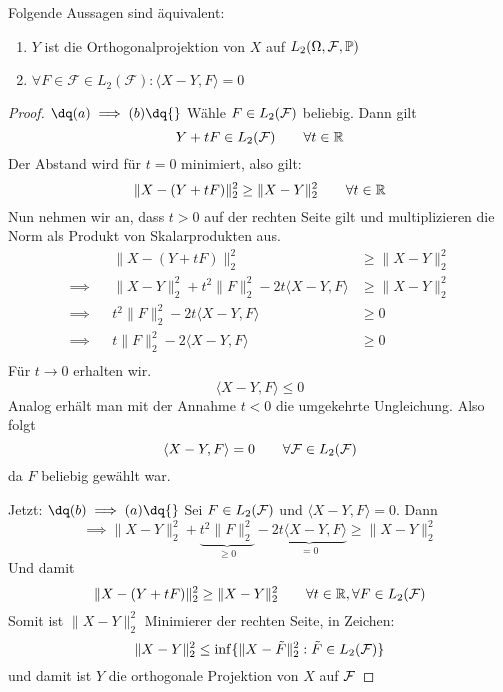 \begin{proposition}\label{Prop1.3}
	Folgende Aussagen sind äquivalent:
	\renewcommand{\labelenumi}{(\alph{enumi})}
	\begin{enumerate}
		\item $Y$ ist die Orthogonalprojektion von $X$ auf $L_2(\Omega,\mathcal{F},\P)$ 
		\item $\forall F\in\mathcal{F}\in L_2(\mathcal{F}):\langle X-Y,F\rangle=0$
	\end{enumerate}
\end{proposition}
\begin{proof}
	$\dq (a) \implies (b) \dq{}$ \enter
	Wähle $F \in L_2(\F)$ beliebig. Dann gilt
	\[Y + tF \in L_2(\F) \qquad \forall t \in \R\]
	Der Abstand wird für $t=0$ minimiert, also gilt:
\[\|X-(Y+tF)\|_2^2 \geq \|X-Y\|_2^2 \qquad \forall t \in \R\]
Nun nehmen wir an, dass $t>0$ auf der rechten Seite gilt und multiplizieren die Norm als Produkt von Skalarprodukten aus.
\begin{align*}
	&&\|X-(Y+tF)\|_2^2 &\geq \|X-Y\|_2^2 \\
	\implies	&&\|X-Y\|_2^2 + t^2\|F\|_2^2 - 2t\langle X-Y, F \rangle &\geq \|X-Y\|_2^2 \\
	\implies	&&t^2\|F\|_2^2 - 2t\langle X-Y, F \rangle &\geq 0 \\
	\implies	&&t\|F\|_2^2 - 2\langle X-Y, F \rangle &\geq 0 \\
\end{align*}
Für $t\rightarrow0$ erhalten wir.
\[\langle X-Y, F \rangle \leq 0\]
Analog erhält man mit der Annahme $t<0$ die umgekehrte Ungleichung.
Also folgt
\[\langle X-Y, F \rangle = 0 \qquad \forall \F \in L_2(\F)\]
da $F$ beliebig gewählt war.\enter

Jetzt: $\dq (b) \implies (a) \dq{}$ \enter
Sei $F\in L_2(\F)$ und $\langle X-Y, F \rangle = 0$. Dann
\[\implies \|X-Y\|_2^2 + \underbrace{t^2\|F\|_2^2}_{\geq 0} - \underbrace{2t\langle X-Y, F \rangle}_{=0} \geq \|X-Y\|_2^2\]
Und damit 
\[\|X-(Y+tF)\|_2^2 \geq \|X-Y\|_2^2 \qquad \forall t\in\R, \forall F\in L_2(\F)\]
Somit ist $\|X-Y\|_2^2$ Minimierer der rechten Seite, in Zeichen:
\[\|X-Y\|_2^2 \leq \inf\{\|X-\tilde{F}\|_2^2 : \tilde{F}\in L_2(\F)\}\]
und damit ist $Y$ die orthogonale Projektion von $X$ auf $\F$
\end{proof}

